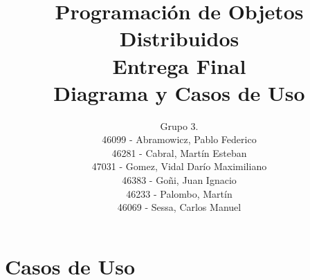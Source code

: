 \documentclass[a4paper,11pt]{article}
\title{
        Programaci\'on de Objetos Distribuidos \\
        Entrega Final \\
        Diagrama y Casos de Uso
    }
\author{
        Grupo 3. \\
        46099 - Abramowicz, Pablo Federico \\
        46281 - Cabral, Mart\'in Esteban \\
        47031 - Gomez, Vidal Dar\'io Maximiliano \\
        46383 - Go\~ni, Juan Ignacio \\
        46233 - Palombo, Mart\'in \\
        46069 - Sessa, Carlos Manuel
        }
\date{}
\begin{document}
\maketitle
\pagebreak

\renewcommand{\theenumi}{\arabic{enumi}.}
\renewcommand{\labelenumi}{\theenumi}

\renewcommand{\theenumii}{\arabic{enumii}.}
\renewcommand{\labelenumii}{\theenumii}

\renewcommand{\theenumiii}{\arabic{enumiii}.}
\renewcommand{\labelenumiii}{\theenumiii}

\pagebreak

\section{Casos de Uso}

\end{document}
